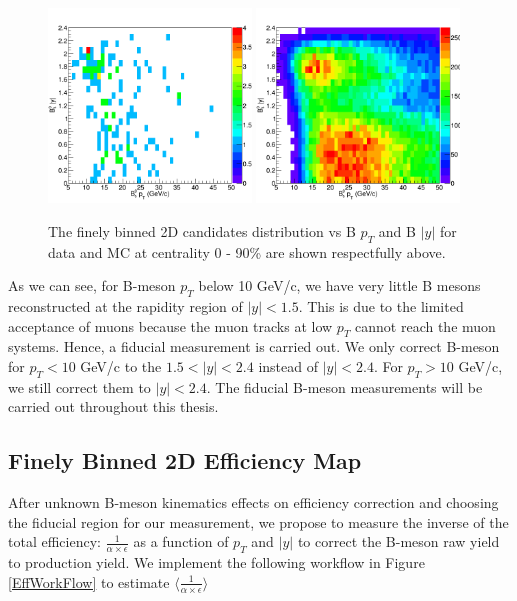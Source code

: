 \begin{figure}[h]
\begin{center}
\includegraphics[width= 0.48\textwidth]{Figures/Chapter5/hBptByData.png}
\includegraphics[width= 0.48\textwidth]{Figures/Chapter5/hBptByMC.png}
\caption{The finely binned 2D candidates distribution vs B $p_T$ and B $|y|$ for data and MC at centrality 0 - 90\% are shown respectfully above.}
\label{Bs2DRECO}
\end{center}
\end{figure}

As we can see, for B-meson $p_T$ below 10 GeV/c, we have very little B mesons reconstructed at the rapidity region of $|y| < 1.5$. This is due to the limited acceptance of muons because the muon tracks at low $p_T$ cannot reach the muon systems. Hence, a fiducial measurement is carried out. We only correct B-meson for $p_T < 10$ GeV/c to the $1.5 < |y| < 2.4$ instead of $|y| < 2.4$. For $p_T > 10$ GeV/c, we still correct them to $|y| < 2.4$. The fiducial B-meson measurements will be carried out throughout this thesis.

\subsection{Finely Binned 2D Efficiency Map}

After unknown B-meson kinematics effects on efficiency correction and choosing the fiducial region for our measurement, we propose to measure the inverse of the total efficiency: $\frac{1}{\alpha \times \epsilon}$ as a function of $p_T$ and $|y|$ to correct the B-meson raw yield to production yield. We implement the following workflow in Figure \ref{EffWorkFlow} to estimate $\langle \frac{1}{\alpha \times \epsilon} \rangle$


